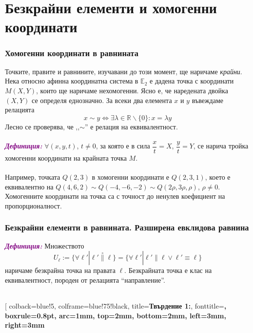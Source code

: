 \documentclass[12pt]{article}
\begin{document}
\geomtitle
\tableofcontents
\pagebreak

\LARGE{\part{Безкрайни елементи и хомогенни координати}}
\Large{\section{ Хомогенни координати в равнината}}
\Large{Точките, правите и равнините, изучавани до този момент, ще наричаме \textit{крайни}. Нека относно афинна координатна система в $\mathbb{E}_2$ е дадена точка с координати $M(X,Y)$, които ще наричаме нехомогенни. Ясно е, че наредената двойка $(X,Y)$ се определя еднозначно. За всеки два елемента $x$ и $y$ въвеждаме релацията $$x\sim y\Leftrightarrow\exists\lambda\in\mathbb{R}\backslash\{0\}:x=\lambda y$$
Лесно се проверява, че ,,$\sim$'' е релация на еквивалентност.\\
\\
\textbf{\textit{\textcolor{purple}{Дефиниция:}}} $\forall(x,y,t)$, $t\neq 0$, за която е в сила $\dfrac{x}{t}=X$, $\dfrac{y}{t}=Y$, се нарича тройка хомогенни координати на крайната точка $M$.
\\
\\
Например, точката $Q(2,3)$ в хомогенни координати е $Q(2,3,1)$, което е еквивалентно на $Q(4,6,2)\sim Q(-4,-6,-2)\sim Q(2\rho,3\rho,\rho)$, $\rho\neq 0$. Хомогенните координати на точка са с точност до ненулев коефициент на пропорционалност.
\\ \Large{\section{ Безкрайни елементи в равнината. Разширена евклидова равнина}}
\Large{\textbf{\textit{\textcolor{purple}{Дефиниция:}}} Множеството $$U_\ell:= \lbrace \forall \ell' | \ell' \overset{\circ}{\parallel}\ell\rbrace= \lbrace \forall \ell'|\ell'\parallel \ell\vee \ell'\equiv \ell\rbrace $$ наричаме безкрайна точка на правата $\ell$. Безкрайната точка е клас на еквивалентност, породен от релацията ``направление''.}
\\
\\
\begin{tcolorbox}[
    colback=blue!5,    %
    colframe=blue!75!black, %
    title={\textbf{Твърдение 1:}}, %
    fonttitle=\bfseries,
    boxrule=0.8pt,
    arc=1mm,           %
    top=2mm, bottom=2mm, left=3mm, right=3mm

\end{tcolorbox}}
\end{document}
